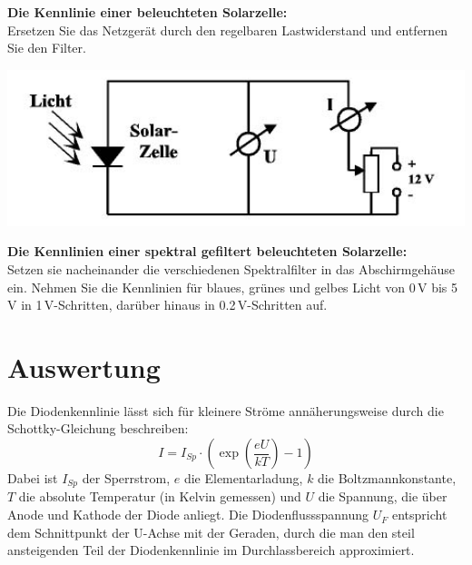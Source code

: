 \begin{enumerate}
	\begin{minipage}{0.6\textwidth}
			\item \textbf{Die Kennlinie einer beleuchteten Solarzelle:}\\
		Ersetzen Sie das Netzgerät durch den regelbaren Lastwiderstand und entfernen Sie den Filter.
	\end{minipage}
	\begin{minipage}{0.4\textwidth}
				\includegraphics[width=1.00\textwidth]{Versuch_17-18/Abbildungen/solarzelle.jpg}
				\label{fig:solarzelle }
		\end{minipage}
	\item \textbf{Die Kennlinien einer spektral gefiltert beleuchteten Solarzelle:}\\
		Setzen sie nacheinander die verschiedenen Spektralfilter in das Abschirmgehäuse ein. Nehmen Sie die Kennlinien für blaues, grünes und gelbes Licht von 0\,V bis 5\,V in 1\,V-Schritten, darüber hinaus in 0.2\,V-Schritten auf.
\end{enumerate}

\section{Auswertung} 

Die Diodenkennlinie lässt sich für kleinere Ströme annäherungsweise durch die Schottky-Gleichung beschreiben:
\begin{equation}
I = I_{Sp}\cdot\left(\exp\left(\frac{eU}{kT}\right)-1\right)
\end{equation}
Dabei ist $I_{Sp}$ der Sperrstrom, $e$ die Elementarladung, $k$ die Boltzmannkonstante, $T$ die absolute Temperatur (in Kelvin gemessen) und $U$ die Spannung, die über Anode und Kathode der Diode anliegt. Die Diodenflussspannung $U_F$ entspricht dem Schnittpunkt der U-Achse mit der Geraden, durch die man den steil ansteigenden Teil der Diodenkennlinie im Durchlassbereich approximiert.

